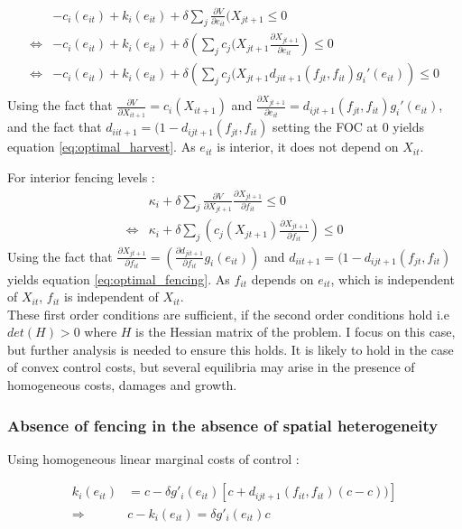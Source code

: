 \begin{align*}
&- c_i(e_{it}) + k_i(e_{it}) + \delta \sum_{j}\frac{\partial V}{\partial e_{it}}(X_{jt+1} \leq 0 \\
\iff & - c_i(e_{it}) + k_i(e_{it}) + \delta \left(  \sum_j c_j(X_{jt+1}\frac{\partial X_{jt+1}}{\partial e_{it}}\right) \leq 0\\
\iff & - c_i(e_{it}) + k_i(e_{it}) + \delta \left( \sum_j c_j(X_{jt+1} d_{jit+1}(f_{jt}, f_{it}) g_i'(e_{it})\right) \leq 0 \\
\end{align*}
Using the fact that $\frac{\partial V}{\partial X_{it+1}} = c_i(X_{it+1})$ and $\frac{\partial X_{jt+1}}{\partial e_{it}} = d_{ijt+1}(f_{jt}, f_{it})g_i'(e_{it})$, and the fact that $d_{iit+1}=(1-d_{ijt+1}(f_{jt},f_{it})$ setting the FOC at 0 yields equation \ref{eq:optimal_harvest}. As $e_{it}$ is interior, it does not depend on $X_{it}$. 

For interior fencing levels : 
\begin{align*}
&\kappa_i + \delta \sum_j \frac{\partial V}{\partial X_{jt+1}}\frac{\partial X_{jt+1}}{\partial f_{it}}\leq 0\\
\iff & \kappa_i + \delta \sum_j \left( c_j(X_{jt+1}) \frac{\partial X_{jt+1}}{\partial f_{it}}\right) \leq 0
\end{align*}
Using the fact that $\frac{\partial X_{jt+1}}{\partial f_{it}} = \left( \frac{\partial d_{jit+1}}{\partial f_{it}}g_i(e_{it})\right)$ and $d_{iit+1} = (1 - d_{ijt+1}(f_{jt},f_{it})$ yields equation \ref{eq:optimal_fencing}. As $f_{it}$ depends on $e_{it}$, which is independent of $X_{it}$, $f_{it}$ is independent of $X_{it}$. 
\\
These first order conditions are sufficient, if the second order conditions hold i.e $det(H)>0$ where $H$ is the Hessian matrix of the problem. I focus on this case, but further analysis is needed to ensure this holds. It is likely to hold in the case of convex control costs, but several equilibria may arise in the presence of homogeneous costs, damages and growth.

\subsubsection{Absence of fencing in the absence of spatial heterogeneity}
\label{appendix:proof_absence_fencing}
Using homogeneous linear marginal costs of control : 

\begin{align*}
k_i(e_{it})& = c - \delta g'_i(e_{it})\left[c + d_{ijt+1}(f_{it}, f_{it})(c - c)) \right]\\
\Rightarrow & c - k_i(e_{it}) = \delta g'_i(e_{it}) c
\end{align*}

